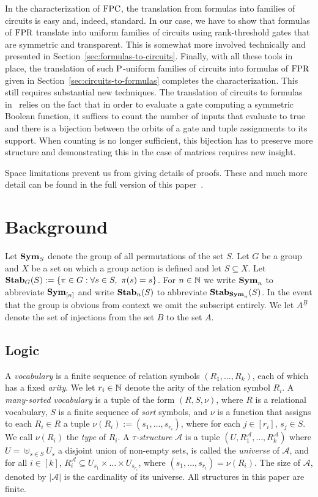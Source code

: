 \documentclass[a4paper,UKenglish]{lipics-v2018}
\begin{document}
In the characterization of $\text{\upshape FPC}$, the translation from formulas into families
of circuits is easy and, indeed, standard. In our case, we have to show that
formulas of $\text{\upshape FPR}$ translate into uniform families of circuits using
rank-threshold gates that are symmetric and transparent. This is somewhat more
involved technically and presented in Section~\ref{sec:formulas-to-circuits}.
Finally, with all these tools in place, the translation of such $\mathrm{P}$-uniform
families of circuits into formulas of $\text{\upshape FPR}$ given in
Section~\ref{sec:circuits-to-formulas} completes the characterization. This
still requires substantial new techniques. The translation of circuits to
formulas in~\cite{AndersonD17} relies on the fact that in order to evaluate a
gate computing a symmetric Boolean function, it suffices to count the number of
inputs that evaluate to true and there is a bijection between the orbits of a
gate and tuple assignments to its support. When counting is no longer
sufficient, this bijection has to preserve more structure and demonstrating this
in the case of matrices requires new insight.

Space limitations prevent us from giving details of proofs. These and much more
detail can be found in the full version of this paper~\cite{DW-arxiv}.


\section{Background}\label{sec:background}
Let $\text{\textbf{Sym}}_S$ denote the group of all permutations of the set $S$. Let $G$ be a
group and $X$ be a set on which a group action is defined and let $S \subseteq
X$. Let $\text{\textbf{Stab}}_G(S) := \{\pi \in G : \forall s \in S , \,\, \pi(s) = s\}$. For
$n \in \mathbb{N}$ we write $\text{\textbf{Sym}}_n$ to abbreviate $\text{\textbf{Sym}}_{[n]}$ and write
$\text{\textbf{Stab}}_n(S)$ to abbreviate $\text{\textbf{Stab}}_{\text{\textbf{Sym}}_n}(S)$. In the event that the group is
obvious from context we omit the subscript entirely. We let $A^{\underline{B}}$
denote the set of injections from the set $B$ to the set $A$.

\subsection{Logic}
A \emph{vocabulary} is a finite sequence of relation symbols $(R_1, \ldots,
R_k)$, each of which has a fixed \emph{arity}. We let $r_i \in \mathbb{N}$
denote the arity of the relation symbol $R_i$. A \emph{many-sorted vocabulary}
is a tuple of the form $(R, S, \nu)$, where $R$ is a relational vocabulary, $S$
is a finite sequence of \emph{sort} symbols, and $\nu$ is a function that
assigns to each $R_i \in R$ a tuple $\nu(R_i) := (s_1, \ldots, s_{r_i})$, where
for each $j \in [r_i]$, $s_j \in S$. We call $\nu(R_i)$ the \emph{type} of
$R_i$. A \emph{$\tau$-structure} $\mathcal{A}$ is a tuple $(U ,
R^{\mathcal{A}}_1 , \ldots , R^{\mathcal{A}}_k)$ where $U = \uplus_{s \in S }
U_{s}$ a disjoint union of non-empty sets, is called the \emph{universe} of
$\mathcal{A}$, and for all $i \in [k]$, $R^{\mathcal{A}}_i \subseteq U_{s_1}
\times \ldots \times U_{s_{r_i}}$, where $(s_1 , \ldots , s_{r_i}) = \nu (R_i)$.
The size of $\mathcal{A}$, denoted by $\vert \mathcal{A} \vert$ is the
cardinality of its universe. All structures in this paper are finite.
\end{document}
